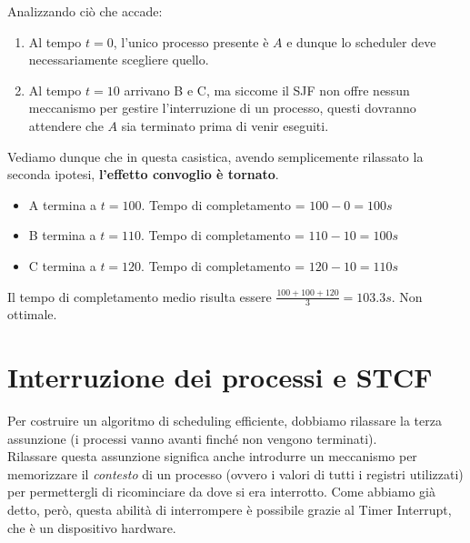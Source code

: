 \documentclass[12pt]{report}
\begin{document}
	\begin{figure}[htbp]
		\centering
	\end{figure}
	Analizzando ciò che accade:
	\begin{enumerate}
		\item Al tempo $t=0$, l'unico processo presente è $A$ e dunque lo scheduler deve necessariamente scegliere quello.
		
		\item Al tempo $t=10$ arrivano B e C, ma siccome il SJF non offre nessun meccanismo per gestire l'interruzione di un processo, questi dovranno attendere che $A$ sia terminato prima di venir eseguiti.
	\end{enumerate}
	Vediamo dunque che in questa casistica, avendo semplicemente rilassato la seconda ipotesi, \textbf{l'effetto convoglio è tornato}.
	\begin{itemize}
		\item A termina a $t=100$. Tempo di completamento = $100-0=100s$
		\item B termina a $t=110$. Tempo di completamento = $110-10=100s$
		\item C termina a $t=120$. Tempo di completamento = $120-10=110s$
	\end{itemize}
	Il tempo di completamento medio risulta essere $\frac{100+100+120}{3} = 103.3s$. Non ottimale.
	
	\section{Interruzione dei processi e STCF}
	Per costruire un algoritmo di scheduling efficiente, dobbiamo rilassare la terza assunzione (i processi vanno avanti finché non vengono terminati).\\
	Rilassare questa assunzione significa anche introdurre un meccanismo per memorizzare il \textit{contesto} di un processo (ovvero i valori di tutti i registri utilizzati) per permettergli di ricominciare da dove si era interrotto.
	Come abbiamo già detto, però, questa abilità di interrompere è possibile grazie al Timer Interrupt, che è un dispositivo hardware.
	\smallbreak
	
\end{document}
